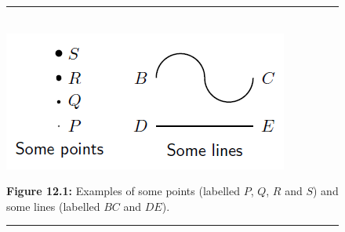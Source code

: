 	\begin{figure}[H] %
    \begin{center}
    \rule[.1in]{\figurerulewidth}{.005in} \\
        \label{m39370*uid7!!!underscore!!!media}\label{m39370*uid7!!!underscore!!!printimage}\includegraphics{col11306.imgs/m39370_MG10C13_001.png} %
      \vspace{2pt}
    \vspace{\rubberspace}\par \begin{cnxcaption}
	  \small \textbf{Figure 12.1: }Examples of some points (labelled \begin{math}P\end{math}, \begin{math}Q\end{math}, \begin{math}R\end{math} and \begin{math}S\end{math}\hspace{1ex}) and some lines (labelled \begin{math}BC\end{math} and \begin{math}DE\end{math}\hspace{1ex}).
	\end{cnxcaption}
    \vspace{.1in}
    \rule[.1in]{\figurerulewidth}{.005in} \\
    \end{center}
 \end{figure}       

